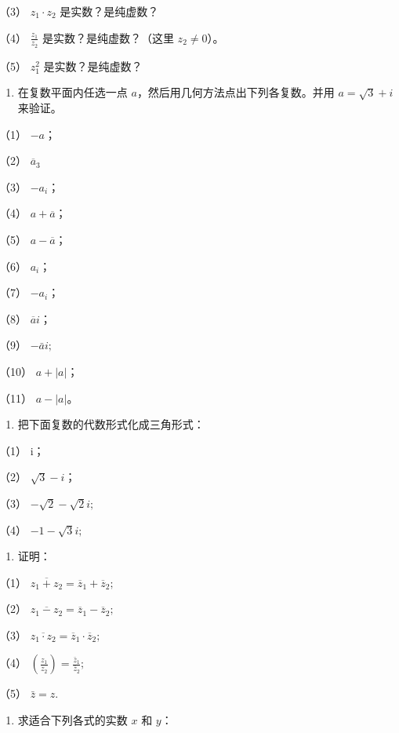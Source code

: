 （3） \(z_{1} \cdot z_{2}\) 是实数？是纯虚数？

（4） \(\frac{z_1}{z_2}\) 是实数？是纯虚数？（这里 \(z_2 \neq 0\)）。

（5） \(z_{1}^{2}\) 是实数？是纯虚数？

\begin{enumerate}[start=3]
\item
  在复数平面内任选一点 \(a\)，然后用几何方法点出下列各复数。并用
  \(a = \sqrt{3} + i\) 来验证。
\end{enumerate}

（1） \(-a\)；

（2） \(\overline{a}_3\)

（3） \(-a_{i}\)；

（4） \(a + \overline{a}\)；

（5） \(a - \overline{a}\)；

（6） \(a_{i}\)；

（7） \(-a_{i}\)；

（8） \(\overline{a} i\)；

（9） \(-\bar{a} i;\)

（10） \(a + |a|\)；

（11） \(a - |a|\)。

\begin{enumerate}[start=4]
\item
  把下面复数的代数形式化成三角形式：
\end{enumerate}

（1） i；

（2） \(\sqrt{3} - i\)；

（3） \(-\sqrt{2} - \sqrt{2} i;\)

（4） \(-1 - \sqrt{3} i;\)

\begin{enumerate}[start=5]
\item
  证明：
\end{enumerate}

（1） \(\overline{z_1 + z_2} = \overline{z}_1 + \overline{z}_2;\)

（2） \(\overline{z_1 - z_2} = \overline{z}_1 - \overline{z}_2;\)

（3） \(\overline{z_1\cdot z_2} = \overline{z}_1\cdot \overline{z}_2;\)

（4） \(\left(\frac{z_1}{z_2}\right) = \frac{\bar{z}_1}{\bar{z}_2};\)

（5） \(\bar{z} = z.\)

\begin{enumerate}[start=6]
\item
  求适合下列各式的实数 \(x\) 和 \(y\)：
\end{enumerate}

